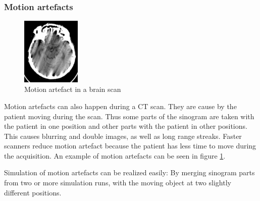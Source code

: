 \subsubsection{Motion artefacts}
\begin{figure}
	\begin{center}
		\vspace{-24pt}
		\includegraphics[width=0.25\textwidth]{images/motion.png}
	\end{center}
	\caption{Motion artefact in a brain scan\cite{CausesAndReductionTechniques}}
	\label{motion}
\end{figure}
\par Motion artefacts can also happen during a CT scan. They are cause by the patient moving during the scan. Thus some parts of the sinogram are taken with the patient in one position and other parts with the patient in other positions. This causes blurring and double images, as well as long range streaks. Faster scanners reduce motion artefact because the patient has less time to move during the acquisition. An example of motion artefacts can be seen in figure \ref{motion}.
\par Simulation of motion artefacts can be realized easily: By merging sinogram parts from two or more simulation runs, with the moving object at two slightly different positions.\cite{deMan}
